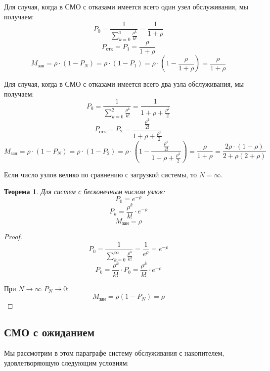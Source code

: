 \documentclass[aps,%
12pt,%
final,%
oneside,
onecolumn,%
musixtex, %
superscriptaddress,%
centertags]{article} %
\theoremstyle{plain}
\newtheorem{theorem}{Теорема}[section] %
\theoremstyle{definition}
\theoremstyle{remark}
\begin{document}
Для случая, когда в СМО с отказами имеется всего один узел обслуживания, мы получаем:
$$P_0 =  \frac{1}{\sum\limits_{k=0}^{1} \frac{\rho^k}{k!}} = \frac{1}{1+\rho}$$
$$P_{\text{отк}} = P_1 =  \frac{\rho}{1+\rho}$$
$$M_{\text{зан}} = \rho \cdot (1- P_N ) = \rho \cdot(1-P_1) = \rho \cdot \left (1 -  \frac{\rho}{1+\rho}\right) = \frac{\rho}{1+\rho}$$

Для случая, когда в СМО с отказами имеется всего два узла обслуживания, мы получаем:
$$P_0 =  \frac{1}{\sum\limits_{k=0}^{2} \frac{\rho^k}{k!}} = \frac{1}{1+\rho+\frac{\rho^2}{2}}$$
$$P_{\text{отк}} = P_2 =  \frac{\frac{\rho^2}{2!}}{1+\rho+\frac{\rho^2}{2}}$$
$$M_{\text{зан}} = \rho \cdot (1- P_N ) = \rho \cdot(1-P_2) = \rho \cdot \left (1 -   \frac{\frac{\rho^2}{2!}}{1+\rho+\frac{\rho^2}{2}}\right) = \frac{\rho}{1+\rho} = \frac{2\rho \cdot (1-\rho)}{2+\rho(2+\rho)}$$

Если число узлов велико по сравнению с загрузкой системы, то $N = \infty$. 

\begin{theorem}
	Для систем с бесконечным числом узлов:
	$$P_0 = e^{-\rho}$$
	$$P_k = \frac{\rho^k}{k!} \cdot e^{-\rho}$$
	$$M_{\text{зан}} =\rho$$
\end{theorem}
\begin{proof}
	$$P_0 = \frac{1}{\sum\limits_{k=0}^{\infty} \frac{\rho^k}{k!}} = \frac{1}{e^{\rho}} = e^{-\rho}$$
	$$P_k = \frac{\rho^k}{k!} \cdot P_0 = \frac{\rho^k}{k!} \cdot e^{-\rho}$$

	При $N \to \infty$ $P_N \to 0$:
	$$M_{\text{зан}} = \rho (1-P_N) = \rho$$
\end{proof}

\newpage
\subsection{СМО с ожиданием}

Мы рассмотрим в этом параграфе систему обслуживания с накопителем, удовлетворяющую следующим условиям:
\end{document}
